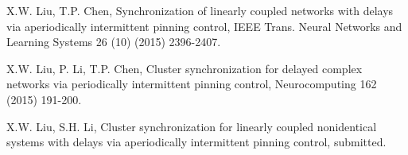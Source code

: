 \documentclass[review]{elsarticle}
\begin{document}
\begin{thebibliography}{99}
X.W. Liu, T.P. Chen, Synchronization of linearly coupled networks with delays via aperiodically intermittent pinning control, IEEE Trans. Neural Networks and Learning Systems 26 (10) (2015) 2396-2407.

X.W. Liu, P. Li, T.P. Chen, Cluster synchronization for delayed complex networks via periodically intermittent pinning control, Neurocomputing 162 (2015) 191-200.

X.W. Liu, S.H. Li, Cluster synchronization for linearly coupled nonidentical systems with delays via aperiodically intermittent pinning control, submitted.

\end{thebibliography}
\end{document}
